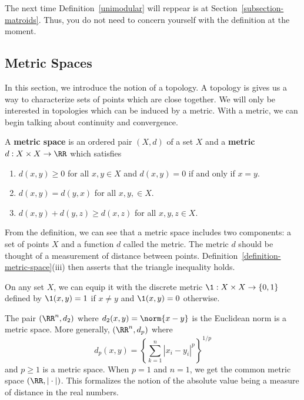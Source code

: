 \documentclass[11pt]{article}
\begin{document}
The next time Definition~\ref{unimodular} will reppear is at Section~\ref{subsection-matroids}. Thus, you do not need to concern yourself with the definition at the moment. 

\subsection{Metric Spaces}
    In this section, we introduce the notion of a topology. A topology is gives us a way to characterize sets of points which are close together. We will only be interested in topologies which can be induced by a metric. With a metric, we can begin talking about continuity and convergence. 
    \begin{defn} \label{definition-metric-space}
        A \textbf{metric space} is an ordered pair $(X, d)$ of a set $X$ and a \textbf{metric} $d : X \times X \to \RR$ which satisfies 
        \begin{enumerate}[label = (\roman*)]
            \item $d(x, y) \geq 0$ for all $x, y \in X$ and $d(x, y) = 0$ if and only if $x = y$. 
            \item $d(x, y) = d(y, x)$ for all $x, y, \in X$. 
            \item $d(x, y) + d(y, z) \geq d(x, z)$ for all $x, y, z \in X$. 
        \end{enumerate}
    \end{defn}
    From the definition, we can see that a metric space includes two components: a set of points $X$ and a function $d$ called the metric. The metric $d$ should be thought of a measurement of distance between points. Definition~\ref{definition-metric-space}(iii) then asserts that the triangle inequality holds.
    \begin{example}
        On any set $X$, we can equip it with the discrete metric $\1 : X \times X \to \{0, 1\}$ defined by $\1(x, y) = 1$ if $x \neq y$ and $\1(x, y) = 0$ otherwise. 
    \end{example} 
    \begin{example}
        The pair $(\RR^n, d_2)$ where $d_2(x, y) = \norm{x-y}$ is the Euclidean norm is a metric space. More generally, $(\RR^n, d_p)$ where 
        \[
            d_p(x, y) = \left \{ \sum_{k = 1}^n |x_i - y_i|^p \right \}^{1/p}
        \] 
        and $p \geq 1$ is a metric space. When $p = 1$ and $n = 1$, we get the common metric space $(\RR, |\cdot|)$. This formalizes the notion of the absolute value being a measure of distance in the real numbers.  
    \end{example}
\end{document}
